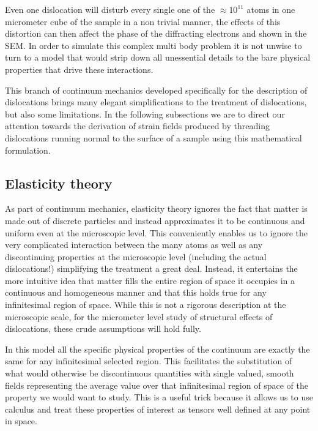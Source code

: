 Even one dislocation will disturb every single one of the $\approx 10^{11}$ atoms in one micrometer cube of the sample in a non trivial manner, the effects of this distortion can then affect the phase of the diffracting electrons and shown in the SEM. In order to simulate this complex multi body problem it is not unwise to turn to a model that would strip down all unessential details to the bare physical properties that drive these interactions.

This branch of continuum mechanics developed specifically for the description of dislocations brings many elegant simplifications to the treatment of dislocations, but also some limitations. In the following subsections we are to direct our attention towards the derivation of strain fields produced by threading dislocations running normal to the surface of a sample using this mathematical formulation.

\subsection{Elasticity theory}
 As part of continuum mechanics, elasticity theory ignores the fact that matter is made out of discrete particles and instead approximates it to be continuous and uniform even at the microscopic level. This conveniently enables us to ignore the very complicated interaction between the many atoms as well as any discontinuing properties at the microscopic level (including the actual dislocations!) simplifying the treatment a great deal. Instead, it entertains the more intuitive idea that matter fills the entire region of space it occupies in a continuous and homogeneous manner and that this holds true for any infinitesimal region of space. While this is not a rigorous description at the microscopic scale, for the micrometer level study of structural effects of dislocations, these crude assumptions will hold fully.

In this model all the specific physical properties of the continuum are exactly the same for
any infinitesimal selected region. This facilitates the substitution of what would otherwise be discontinuous quantities with single valued, smooth fields representing the average value over that infinitesimal region of space of the property we would want to study. This is a useful trick because it allows us to use calculus and treat these properties of interest as tensors well defined at any point in space.

